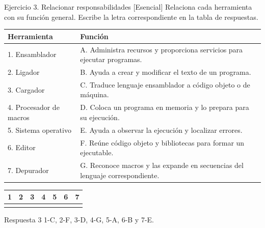 \documentclass[11pt,spanish]{article}
\begin{document}
\begin{ejercicio}{Ejercicio 3. Relacionar responsabilidades \hfill {\small [Esencial]}}
Relaciona cada herramienta con su función general. Escribe la letra correspondiente en la tabla de respuestas.

\begin{center}
\small
\begin{tabular}{|p{}|p{}|}
\hline
\textbf{Herramienta} & \textbf{Función} \tabularnewline
\hline
1. Ensamblador & A. Administra recursos y proporciona servicios para ejecutar programas. \tabularnewline
\hline
2. Ligador & B. Ayuda a crear y modificar el texto de un programa. \tabularnewline
\hline
3. Cargador & C. Traduce lenguaje ensamblador a código objeto o de máquina. \tabularnewline
\hline
4. Procesador de macros & D. Coloca un programa en memoria y lo prepara para su ejecución. \tabularnewline
\hline
5. Sistema operativo & E. Ayuda a observar la ejecución y localizar errores. \tabularnewline
\hline
6. Editor & F. Reúne código objeto y bibliotecas para formar un ejecutable. \tabularnewline
\hline
7. Depurador & G. Reconoce macros y las expande en secuencias del lenguaje correspondiente. \tabularnewline
\hline
\end{tabular}
\end{center}

\begin{center}
\begin{tabular}{|c|c|c|c|c|c|c|}
\hline
1 & 2 & 3 & 4 & 5 & 6 & 7 \tabularnewline
\hline
\phantom{C} & \phantom{F} & \phantom{D} & \phantom{G} & \phantom{A} & \phantom{B} & \phantom{E} \tabularnewline[0.45cm]
\hline
\end{tabular}
\end{center}
\end{ejercicio}

\ifrespuestas
\begin{respuesta}{Respuesta 3}
1-C, 2-F, 3-D, 4-G, 5-A, 6-B y 7-E.
\end{respuesta}
\fi
\end{document}
